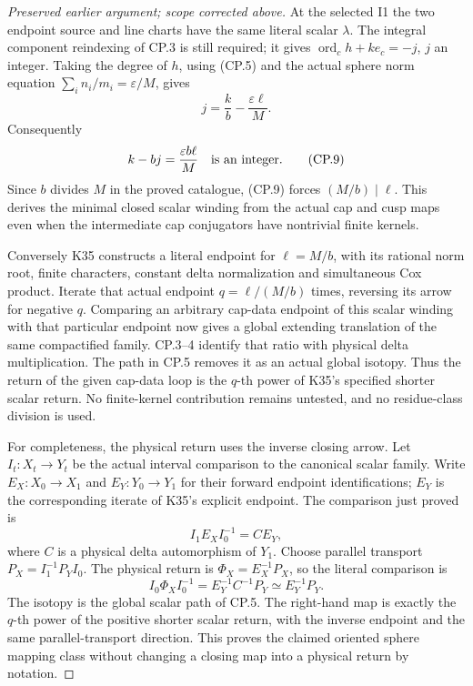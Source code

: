 \begin{proof}[Preserved earlier argument; scope corrected above]
At the selected I1 the two endpoint source and line charts have the
same literal scalar \(\lambda\). The integral component reindexing of
CP.3 is still required; it gives
\(\operatorname{ord}_c h+ke_c=-j\), \(j\) an integer. Taking the degree
of \(h\), using (CP.5) and the actual sphere norm equation
\(\sum_i n_i/m_i=\varepsilon/M\), gives
\[
                 j=\frac{k}{b}-\frac{\varepsilon\ell}{M}.
                                                               \tag{CP.8}
\]
Consequently
\[
                  k-bj=\frac{\varepsilon b\ell}{M}
                          \quad\hbox{is an integer}.           \tag{CP.9}
\]
Since \(b\) divides \(M\) in the proved catalogue, (CP.9) forces
\((M/b)\mid\ell\). This derives the minimal closed scalar winding
from the actual cap and cusp maps even when the intermediate cap
conjugators have nontrivial finite kernels.

Conversely K35 constructs a literal endpoint for \(\ell=M/b\),
with its rational norm root, finite characters, constant delta
normalization and simultaneous Cox product. Iterate that actual
endpoint \(q=\ell/(M/b)\) times, reversing its arrow for negative
\(q\). Comparing an arbitrary cap-data endpoint of this scalar winding
with that particular endpoint now gives a global extending
translation of the same compactified family. CP.3--4 identify that
ratio with physical delta multiplication. The path in CP.5 removes
it as an actual global isotopy. Thus the return of the given
cap-data loop is the \(q\)-th power of K35's specified shorter scalar
return. No finite-kernel contribution remains untested, and no
residue-class division is used.

For completeness, the physical return uses the inverse closing
arrow. Let \(I_t:X_t\to Y_t\) be the actual interval comparison to
the canonical scalar family. Write \(E_X:X_0\to X_1\) and
\(E_Y:Y_0\to Y_1\) for their forward endpoint identifications;
\(E_Y\) is the corresponding iterate of K35's explicit endpoint.
The comparison just proved is
\[
             I_1E_XI_0^{-1}=C E_Y,                         \tag{CP.10}
\]
where \(C\) is a physical delta automorphism of \(Y_1\). Choose
parallel transport \(P_X=I_1^{-1}P_YI_0\). The physical return
is \(\Phi_X=E_X^{-1}P_X\), so the literal comparison is
\[
 I_0\Phi_XI_0^{-1}=E_Y^{-1}C^{-1}P_Y
                    \simeq E_Y^{-1}P_Y.                  \tag{CP.11}
\]
The isotopy is the global scalar path of CP.5. The right-hand map
is exactly the \(q\)-th power of the positive shorter scalar
return, with the inverse endpoint and the same parallel-transport
direction. This proves the claimed oriented sphere mapping class
without changing a closing map into a physical return by notation.


\end{proof}

